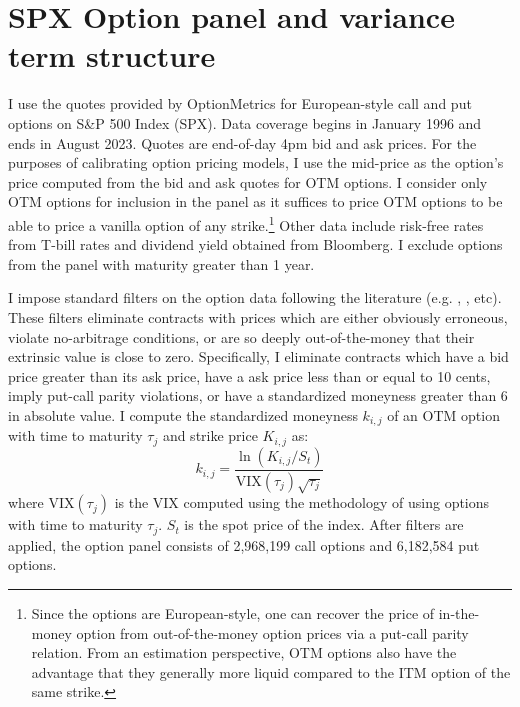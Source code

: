 \documentclass[12pt]{article}
\begin{document}
\section{SPX Option panel and variance term structure}\label{sec: data}
I use the quotes provided by OptionMetrics for European-style call and put options on S\&P 500 Index (SPX). Data coverage begins in January 1996 and ends in August 2023. Quotes are end-of-day 4pm bid and ask prices. For the purposes of calibrating option pricing models, I use the mid-price as the option's price computed from the bid and ask quotes for OTM options. I consider only OTM options for inclusion in the panel as it suffices to price OTM options to be able to price a vanilla option of any strike.\footnote{Since the options are European-style, one can recover the price of in-the-money option from out-of-the-money option prices via a put-call parity relation. From an estimation perspective, OTM options also have the advantage that they generally more liquid compared to the ITM option of the same strike. } Other data include risk-free rates from T-bill rates and dividend yield obtained from Bloomberg. I exclude options from the panel with maturity greater than 1 year.

I impose standard filters on the option data following the literature (e.g. \cite{constantinides2013puzzle},  \cite{goyal2022equity}, etc). These filters eliminate contracts with prices which are either obviously erroneous, violate no-arbitrage conditions, or are so deeply out-of-the-money that their extrinsic value is close to zero. Specifically, I eliminate contracts which have a bid price greater than its ask price, have a ask price less than or equal to 10 cents, imply put-call parity violations, or have a standardized moneyness greater than 6 in absolute value. I compute the standardized moneyness $k_{i,j}$ of an OTM option with time to maturity $\tau_{j}$ and strike price $K_{i,j}$ as:
$$k_{i,j} = \dfrac{\ln\left(K_{i,j}/S_t\right)}{\text{VIX}(\tau_{j})\sqrt{\tau_{j}}}$$
where $\text{VIX}(\tau_{j})$ is the VIX computed using the methodology of \cite{jiang2005model} using options with time to maturity $\tau_{j}$. $S_t$ is the spot price of the index.  After filters are applied, the option panel consists of 2,968,199 call options and 6,182,584 put options.
\end{document}
